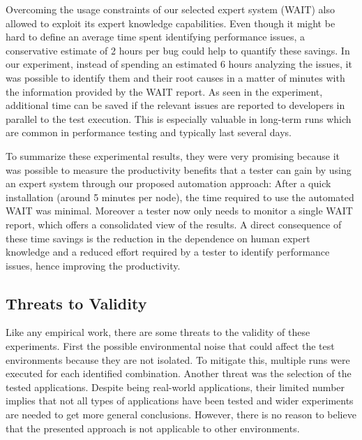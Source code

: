 \documentclass[runningheads,a4paper]{llncs}
\newcommand{\myspaceM}{-7.6pt}
\begin{document}
Overcoming the usage constraints of our selected expert system (WAIT) also
allowed to exploit its expert knowledge capabilities. Even though it might
be hard to define an average time spent identifying performance issues, a
conservative estimate of 2 hours per bug could help to quantify these savings.
In our experiment, instead of spending an estimated 6 hours analyzing the
issues, it was possible to identify them and their root causes in a matter of
minutes with the information provided by the WAIT report. As seen in the
experiment, additional time can be saved if the relevant issues are reported to
developers in parallel to the test execution. This is especially valuable in
long-term runs which are common in performance testing and typically last
several days.

To summarize these experimental results, they were very promising because it
was possible to measure the productivity benefits that a tester can gain by using
an expert system through our proposed automation approach: After a quick
installation (around 5 minutes per node), the time required to use the automated WAIT was
minimal. Moreover a tester now only needs to monitor a single WAIT report, which
offers a consolidated view of the results. A direct consequence of these
time savings is the reduction in the dependence on human expert knowledge and
a reduced effort required by a tester to identify performance issues, hence
improving the productivity.

\vspace{\myspaceM{}}
\subsection{Threats to Validity}
\vspace{\myspaceM{}}
Like any empirical work, there are some threats to the validity of these
experiments. First the possible environmental noise that could affect the test
environments because they are not isolated. To mitigate this, multiple runs were
executed for each identified combination. Another threat was the selection of
the tested applications. Despite being real-world applications, their limited
number implies that not all types of applications have been tested and wider
experiments are needed to get more general conclusions. However, there is no
reason to believe that the presented approach is not applicable to other
environments.

\end{document}

